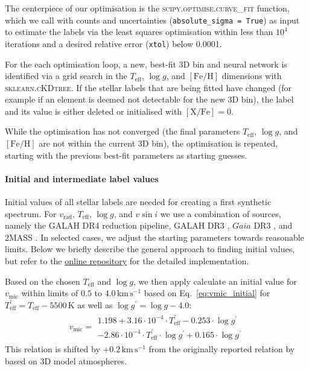 \documentclass[
  journal=pasa,
  manuscript=research-paper, %
  year=2021,
  volume=37
]{cup-journal}
\newcommand{\Teff}{$T_\mathrm{eff}$\xspace}
\newcommand{\logg}{$\log g$\xspace}
\newcommand{\feh}{$\mathrm{[Fe/H]}$\xspace}
\newcommand{\vmic}{$v_\mathrm{mic}$\xspace}
\newcommand{\vsini}{$v \sin i$\xspace}
\newcommand{\vrad}{$v_\mathrm{rad}$\xspace}
\newcommand{\Gaia}{\textit{Gaia}\xspace}
\newcommand{\TLF}{\Teff, \logg, and \feh}
\newcommand{\kms}{\,\mathrm{km\,s^{-1}}}	%
\begin{document}
The centerpiece of our optimisation is the \textsc{scipy.optimise.curve\_fit} function, which we call with counts and uncertainties (\texttt{absolute\_sigma = True}) as input to estimate the labels via the least squares optimisation within less than $10^4$ iterations and a desired relative error (\texttt{xtol}) below 0.0001.

For the each optimisation loop, a new, best-fit 3D bin and neural network is identified via a grid search in the \TLF dimensions with \textsc{sklearn.cKDtree}. If the stellar labels that are being fitted have changed (for example if an element is deemed not detectable for the new 3D bin), the label and its value is either deleted or initialised with $\mathrm{[X/Fe]} = 0$.

While the optimisation has not converged (the final parameters \TLF are not within the current 3D bin), the optimisation is repeated, starting with the previous best-fit parameters as starting guesses.

\paragraph{Initial and intermediate label values}

Initial values of all stellar labels are needed for creating a first synthetic spectrum. For \vrad, \Teff, \logg, and \vsini we use a combination of sources, namely the GALAH DR4 reduction pipeline, GALAH DR3 \citep{Buder2021}, $\Gaia$ DR3 \citep{Brown2021}, and 2MASS \citep{Skrutskie2006}. In selected cases, we adjust the starting parameters towards reasonable limits. Below we briefly describe the general approach to finding initial values, but refer to the \href{https://github.com/svenbuder/GALAH_DR4/blob/main/spectrum_analysis/galah_dr4_initial_parameters.ipynb}{online repository} for the detailed implementation. 

Based on the chosen \Teff and \logg, we then apply calculate an initial value for \vmic within limits of $0.5$ to $4.0\kms$ based on Eq.~\ref{eq:vmic_initial} for $T_\text{eff}^\prime = T_\text{eff} - 5500\,\mathrm{K}$ as well as $\log g^\prime = \log g - 4.0$:
\begin{align} 
v_\text{mic} = \begin{array}{l}
1.198 + 3.16 \cdot 10^{-4} \cdot T_\text{eff}^\prime - 0.253 \cdot \log g^\prime \\ - 2.86\cdot 10^{-4} \cdot T_\text{eff}^\prime \cdot \log g^\prime + 0.165 \cdot \log g^\prime
\end{array} \label{eq:vmic_initial}
\end{align}
This relation is shifted by $+0.2\kms$ from the originally reported relation by \citet{DutraFerreira2016} based on 3D model atmospheres.
\end{document}
